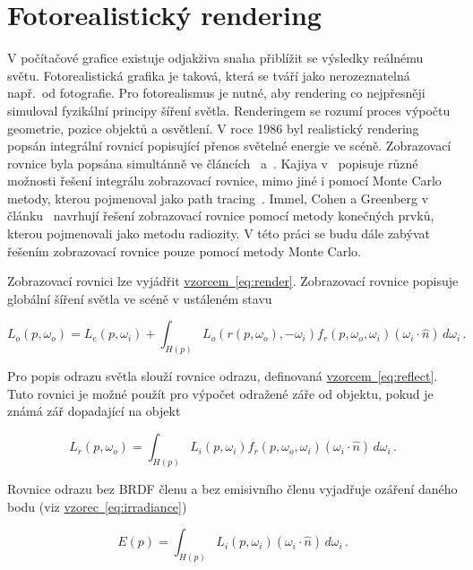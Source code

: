 \documentclass[czech,master]{diploma}
\newcommand{\uvec}[1]{\hat{#1}}
\newcommand{\point}{p}
\newcommand{\brdf}{f_r\left(\point,\omega_{o},\omega_{i}\right)}
\newcommand{\normVec}{\uvec{n}}
\newcommand{\inVec}{\omega_{i}}
\newcommand{\outVec}{\omega_{o}}
\newcommand{\reflRadiance}{L_r\left(\point,\outVec\right)}
\newcommand{\outRadiance}{L_o\left(\point,\outVec\right)}
\newcommand{\inRadiance}{L_i\left(\point,\inVec\right)}
\newcommand{\emitRadiance}{L_e\left(\point,\inVec\right)}
\newcommand{\rt}{r\left(\point,\outVec\right)}
\newcommand{\radiancert}{L_o\left(\rt,-\inVec\right)}
\newcommand{\irradiance}{E\left(\point\right)}
\newcommand{\inDotNorm}{\left(\inVec\cdot\normVec\right)}
\begin{document}
\clearpage
\chapter{Fotorealistický rendering}
V počítačové grafice existuje odjakživa snaha přiblížit se výsledky reálnému světu. Fotorealistická grafika je taková, která se tváří jako nerozeznatelná např.\ od fotografie. Pro fotorealismus je nutné, aby rendering co nejpřesněji simuloval fyzikální principy šíření světla. Renderingem se rozumí proces výpočtu geometrie, pozice objektů a osvětlení. V roce 1986 byl realistický rendering popsán integrální rovnicí popisující přenos světelné energie ve scéně. Zobrazovací rovnice byla popsána simultánně ve článcích~\cite{KajiyaRenderEq} a~\cite{ImmelRenderEq}. Kajiya v~\cite{KajiyaRenderEq} popisuje různé možnosti řešení integrálu zobrazovací rovnice, mimo jiné i pomocí Monte Carlo metody, kterou pojmenoval jako path tracing~\cite{HainesRayTracingGems2019}. Immel, Cohen a Greenberg v článku~\cite{ImmelRenderEq} navrhují řešení zobrazovací rovnice pomocí metody konečných prvků, kterou pojmenovali jako metodu radiozity. V této práci se budu dále zabývat řešením zobrazovací rovnice pouze pomocí metody Monte Carlo.\par
Zobrazovací rovnici lze vyjádřit \hyperref[eq:render]{vzorcem~\ref{eq:render}}. Zobrazovací rovnice popisuje globální šíření světla ve scéně v ustáleném stavu

\begin{equation} \label{eq:render}
  \outRadiance = \emitRadiance + \int_{H \left( \point \right)}^{~}\radiancert \brdf \inDotNorm \,d\inVec\,.
\end{equation}

Pro popis odrazu světla slouží rovnice odrazu, definovaná \hyperref[eq:render]{vzorcem~\ref{eq:reflect}}. Tuto rovnici je možné použít pro výpočet odražené záře od objektu, pokud je známá zář dopadající na objekt

\begin{equation} \label{eq:reflect}
  \reflRadiance = \int_{H \left( \point \right)}^{~}\inRadiance \brdf \inDotNorm \,d\inVec\,.
\end{equation}

Rovnice odrazu bez BRDF členu a bez emisivního členu vyjadřuje ozáření daného bodu (viz \hyperref[eq:irradiance]{vzorec~\ref{eq:irradiance}})~\cite{Dutre2003GICompendum}

\begin{equation} \label{eq:irradiance}
  \irradiance = \int_{H \left( \point \right)}^{~}\inRadiance \inDotNorm \,d\inVec\,.
\end{equation}
\end{document}
